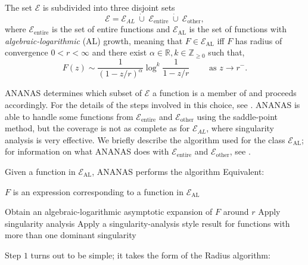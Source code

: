 \documentclass[12pt]{article}
\theoremstyle{plain}
\begin{document}
The set \( \mathscr{E} \) is subdivided into three disjoint sets
\[ \mathscr{E} =  \mathscr{E}_{AL} \hspace{3pt} \dot{\cup} \hspace{3pt} \mathscr{E}_{\text{entire}} \hspace{3pt} \dot\cup \hspace{3pt} \mathscr{E}_{\text{other}}, \]
where \( \mathscr{E}_{\text{entire}} \) is the set of entire functions and \( \mathscr{E}_{\text{AL}} \) is the set of functions with \emph{algebraic-logarithmic} (AL) growth,
meaning that \(F \in \mathscr{E}_{\text{AL}} \) iff \( F \) has radius of convergence \(0 < r < \infty \) and there exist \(\alpha \in \mathbb{R}, k \in \mathbb{Z}_{\geq 0} \) such that,
\[ F(z) \sim \frac{1}{(1  -z/r)^\alpha} \log^k \frac{1}{1 -z/{r}} \qquad \text{ as } z \rightarrow {r^-} . \]

ANANAS determines which subset of \( \mathscr{E} \) a function is a member of and proceeds accordingly.
For the details of the steps involved in this choice, see \cite{assistant}.
ANANAS is able to handle some functions from \(\mathscr{E}_{\text{entire}}\) and \(\mathscr{E}_{\text{other}}\) using the saddle-point method, but the coverage is not as complete as for \( \mathscr{E}_{AL} \), where singularity analysis is very effective.
We briefly describe the algorithm used for the class \(\mathscr{E}_{\text{AL}}\);
for information on what ANANAS does with \(\mathscr{E}_{\text{entire}}\) and \(\mathscr{E}_{\text{other}}\), see \cite{assistant}.

Given a function in \(\mathscr{E}_{\text{AL}}\), ANANAS performs the algorithm Equivalent:
\begin{center}
\begin{algorithmic}
\Require \( F \) is an expression corresponding to a function in \( \mathscr{E}_{\text{AL}} \)

         Obtain an algebraic-logarithmic asymptotic expansion of \( F \) around \( r \)
         Apply singularity analysis
\Else
         Apply a singularity-analysis style result for functions with more than one dominant singularity
\EndIf
\end{algorithmic}
\end{center}
Step \(1\) turns out to be simple; it takes the form of the Radius algorithm:
\end{document}
